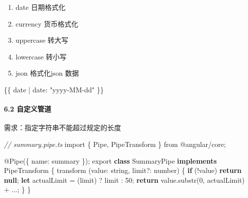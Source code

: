\documentclass[
]{article}
\newenvironment{Shaded}{}{}
\newcommand{\BuiltInTok}[1]{#1}
\newcommand{\CommentTok}[1]{\textcolor[rgb]{0.38,0.63,0.69}{\textit{#1}}}
\newcommand{\ControlFlowTok}[1]{\textcolor[rgb]{0.00,0.44,0.13}{\textbf{#1}}}
\newcommand{\DataTypeTok}[1]{\textcolor[rgb]{0.56,0.13,0.00}{#1}}
\newcommand{\DecValTok}[1]{\textcolor[rgb]{0.25,0.63,0.44}{#1}}
\newcommand{\FunctionTok}[1]{\textcolor[rgb]{0.02,0.16,0.49}{#1}}
\newcommand{\ImportTok}[1]{#1}
\newcommand{\KeywordTok}[1]{\textcolor[rgb]{0.00,0.44,0.13}{\textbf{#1}}}
\newcommand{\NormalTok}[1]{#1}
\newcommand{\OperatorTok}[1]{\textcolor[rgb]{0.40,0.40,0.40}{#1}}
\newcommand{\StringTok}[1]{\textcolor[rgb]{0.25,0.44,0.63}{#1}}
\begin{document}
\begin{enumerate}
\def\labelenumi{\arabic{enumi}.}
\item
  date 日期格式化
\item
  currency 货币格式化
\item
  uppercase 转大写
\item
  lowercase 转小写
\item
  json 格式化json 数据
\end{enumerate}

\begin{Shaded}
\begin{Highlighting}[]
\NormalTok{\{\{ date | date: "yyyy{-}MM{-}dd" \}\}}
\end{Highlighting}
\end{Shaded}

\hypertarget{62-ux81eaux5b9aux4e49ux7ba1ux9053}{%
\paragraph{6.2 自定义管道}\label{62-ux81eaux5b9aux4e49ux7ba1ux9053}}

需求：指定字符串不能超过规定的长度

\begin{Shaded}
\begin{Highlighting}[]
\CommentTok{// summary.pipe.ts}
\ImportTok{import}\NormalTok{ \{ }\BuiltInTok{Pipe}\OperatorTok{,}\NormalTok{ PipeTransform \} }\ImportTok{from} \StringTok{\textquotesingle{}@angular/core\textquotesingle{}}\OperatorTok{;}

\NormalTok{@}\FunctionTok{Pipe}\NormalTok{(\{}
   \DataTypeTok{name}\OperatorTok{:} \StringTok{\textquotesingle{}summary\textquotesingle{}} 
\NormalTok{\})}\OperatorTok{;}
\ImportTok{export} \KeywordTok{class}\NormalTok{ SummaryPipe }\KeywordTok{implements}\NormalTok{ PipeTransform \{}
    \FunctionTok{transform}\NormalTok{ (}\DataTypeTok{value}\OperatorTok{:}\NormalTok{ string}\OperatorTok{,}\NormalTok{ limit}\OperatorTok{?:}\NormalTok{ number) \{}
        \ControlFlowTok{if}\NormalTok{ (}\OperatorTok{!}\NormalTok{value) }\ControlFlowTok{return} \KeywordTok{null}\OperatorTok{;}
        \KeywordTok{let}\NormalTok{ actualLimit }\OperatorTok{=}\NormalTok{ (limit) }\OperatorTok{?}\NormalTok{ limit }\OperatorTok{:} \DecValTok{50}\OperatorTok{;}
        \ControlFlowTok{return}\NormalTok{ value}\OperatorTok{.}\FunctionTok{substr}\NormalTok{(}\DecValTok{0}\OperatorTok{,}\NormalTok{ actualLimit) }\OperatorTok{+} \StringTok{\textquotesingle{}...\textquotesingle{}}\OperatorTok{;}
\NormalTok{    \}}
\NormalTok{\}}
\end{Highlighting}
\end{Shaded}
\end{document}
